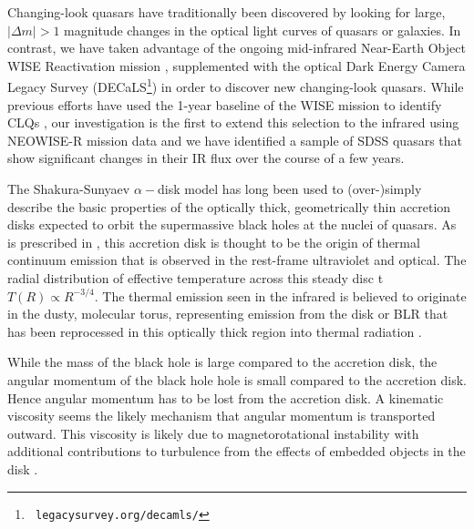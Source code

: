 \documentclass{nature}
\begin{document}
Changing-look quasars have traditionally been discovered by looking
for large, $| \Delta m | >1$ magnitude changes in the optical light curves
of quasars or galaxies. In contrast, we have taken advantage of the ongoing 
mid-infrared Near-Earth Object WISE Reactivation mission \cite[NEOWISE-R;
][]{Mainzer2014, Meisner2017a, Meisner2017b}, supplemented with the 
optical Dark Energy Camera Legacy Survey (DECaLS\footnote{{\tt
legacysurvey.org/decamls/}}) in order to discover new changing-look
quasars. While previous efforts have used the 1-year baseline of the
WISE mission to identify CLQs \cite[e.g.,][]{Assef2017}, our investigation 
is the first to extend this selection to the infrared using NEOWISE-R
mission data and we have identified a sample of SDSS quasars that
show significant changes in their IR flux over the course of a few
years. 

The Shakura-Sunyaev $\alpha-$disk model \cite{SS73} has long been used
to (over-)simply describe the basic properties of the optically thick,
geometrically thin accretion disks expected to orbit the supermassive black holes 
at the nuclei of quasars. 
As is prescribed in \cite{Pringle1981}, this accretion disk is thought
to be the origin of thermal continuum emission that is observed in the
rest-frame ultraviolet and optical.  The radial distribution of
effective temperature across this steady disc t $T(R) \propto
R^{-3/4}$.  The thermal emission seen in the infrared is believed to
originate in the dusty, molecular torus, representing emission from
the disk or BLR that has been reprocessed in this optically thick
region into thermal radiation \citep[see e.g.,][for
reviews]{Antonucci1993, Perlman2008, Lasota2016}.

While the mass of the black hole is large compared to the accretion
disk, the angular momentum of the black hole hole is small compared to
the accretion disk.  Hence angular momentum has to be lost from the
accretion disk.  A kinematic viscosity seems the likely mechanism that
angular momentum is transported outward.  This viscosity is likely due
to magnetorotational instability \citep[MRI][]{Balbus_Hawley1991} with
additional contributions to turbulence from the effects of embedded
objects in the disk \cite[e.g., ][]{McKernan2014}.
\end{document}

